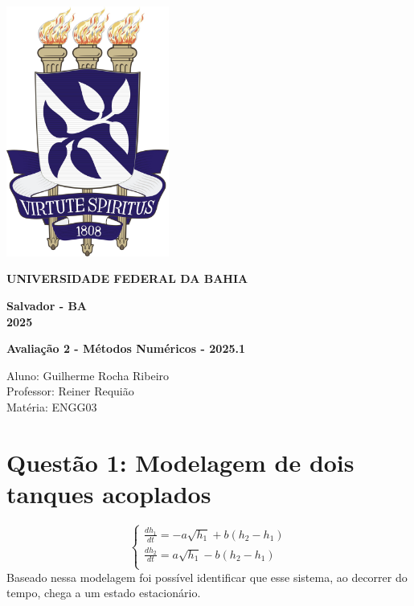 \documentclass{article}
\begin{document}
\begin{titlepage}
    \centering
    \includegraphics[width=0.4\textwidth]{brasao_ufba.jpg} \\
    \vspace{1cm}
    
    \textbf{\large UNIVERSIDADE FEDERAL DA BAHIA} \\
    \vspace{12cm}
    
    \textbf{\large Salvador - BA} \\
    \textbf{\large 2025}
\end{titlepage}




\begin{center}
\large\textbf{Avaliação 2 - Métodos Numéricos - 2025.1} \\
\end{center}

\begin{flushleft}
Aluno: Guilherme Rocha Ribeiro \\
Professor: Reiner Requião \\
Matéria: ENGG03
\end{flushleft}

\section*{Questão 1: Modelagem de dois tanques acoplados}
\justifying
\begin{equation}\label{eq:sistema}
\begin{cases}
\frac{dh_1}{dt} = -a\sqrt{h_1} + b(h_2 - h_1) \\
\frac{dh_2}{dt} = a\sqrt{h_1} - b(h_2 - h_1) \\
\end{cases}
\end{equation}
Baseado nessa modelagem foi possível identificar que esse sistema, ao decorrer do tempo, chega a um estado estacionário.
\end{document}
